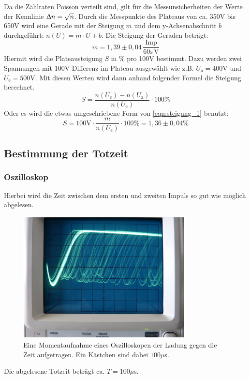 \documentclass[titlepage = firstcover]{scrartcl}
\begin{document}
      Da die Zählraten Poisson verteilt sind, gilt für die Messunsicherheiten der Werte der Kennlinie $\Updelta n = \sqrt{n}$. Durch die Messpunkte des Plateaus von ca. 350V bis 650V wird eine Gerade mit der Steigung $m$ und dem y-Achsenabschnitt $b$ durchgeführt: $n(U) = m \cdot U + b$. Die Steigung der Geraden beträgt:
      \begin{equation}
        m = 1,39 \pm 0,04 \, \frac{\text{Imp}}{60\text{s} \, \text{V}}
      \end{equation}
      Hiermit wird die Plateausteigung $S$ in $\%$ pro 100V bestimmt. Dazu werden zwei Spannungen mit 100V Differenz im Plateau ausgewählt wie z.B. $U_\text{a} = 400$V und $U_\text{e} = 500$V. Mit diesen Werten wird dann anhand folgender Formel die Steigung berechnet.
      \begin{equation}
        S = \frac{n(U_\text{e}) - n(U_\text{a})}{n(U_\text{e})} \cdot 100 \%
        \label{eqn:steigung_1}
      \end{equation}
      Oder es wird die etwas umgeschriebene Form von \autoref{eqn:steigung_1} benutzt:
      \begin{equation}
          S = 100\text{V} \cdot \frac{m}{n(U_\text{e})} \cdot 100 \% = 1,36 \pm 0,04 \%
      \end{equation}

    \subsection{Bestimmung der Totzeit}
      \subsubsection{Oszilloskop}
        Hierbei wird die Zeit zwischen dem ersten und zweiten Impuls so gut wie möglich abgelesen.
        \begin{figure}[h]
          \centering
          \includegraphics[width = 0.7\linewidth]{Oszilloskop_Geiger_Mueller.png}
          \caption{Eine Momentaufnahme eines Oszilloskopen der Ladung gegen die Zeit aufgetragen. Ein Kästchen sind dabei $100 \mu$s.}
          \label{fig:totzeit_erholungszeit}
        \end{figure}
        \FloatBarrier
        Die abgelesene Totzeit beträgt ca. $T = 100 \mu$s.
\end{document}

